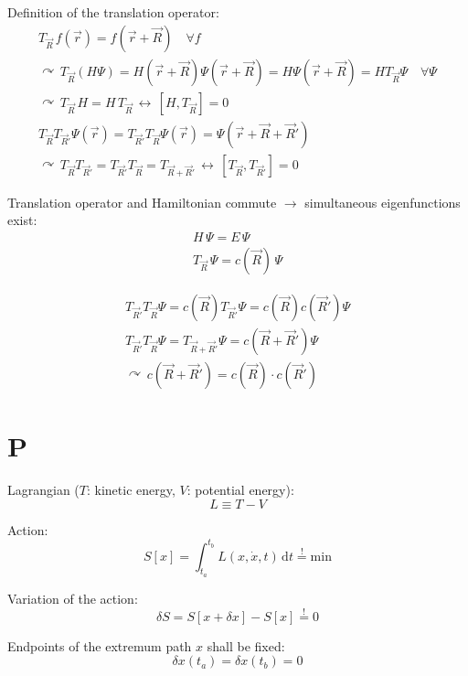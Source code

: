 \documentclass[fontsize=11pt,a4paper]{scrartcl}
\begin{document}
Definition of the translation operator:
\begin{gather*}
	T_{\vec R}\,f(\vec r)=f(\vec r+\vec R)\quad\forall f\\
	\curvearrowright\, T_{\vec R}(H\Psi)=H(\vec r+\vec R)\Psi(\vec r+\vec R)=H\Psi(\vec r+\vec R)=H T_{\vec R}\Psi\quad\forall\Psi\\
	\curvearrowright\,T_{\vec R}\, H=H\,T_{\vec R}\,\leftrightarrow\,[H,T_{\vec R}]=0\\
	T_{\vec R}T_{\vec R'}\Psi(\vec r)=T_{\vec R'}T_{\vec R}\Psi(\vec r)=\Psi(\vec r+\vec R+\vec R')\\
	\curvearrowright\,T_{\vec R}T_{\vec R'}=T_{\vec R'}T_{\vec R}=T_{\vec R+\vec R'}\,\leftrightarrow\,[T_{\vec R},T_{\vec R'}]=0
\end{gather*}

Translation operator and Hamiltonian commute $\to$ simultaneous eigenfunctions exist:
\begin{gather*}
	H\,\Psi=E\,\Psi\\
	T_{\vec R}\,\Psi=c(\vec R)\,\Psi
\end{gather*}

\begin{gather*}
	T_{\vec R'}T_{\vec R}\Psi=c(\vec R)T_{\vec R'}\Psi=c(\vec R)c(\vec R')\Psi\\
	T_{\vec R'}T_{\vec R}\Psi=T_{\vec R+\vec R'}\Psi=c(\vec R+\vec R')\Psi\\
	\curvearrowright\,c(\vec R+\vec R')=c(\vec R)\cdot c(\vec R')
\end{gather*}
%
%
%
%
%
\section{P}

Lagrangian ($T$: kinetic energy, $V$: potential energy):
\[
	L\equiv T-V
\]

Action:
\[
	S[x]=\int_{t_a}^{t_b} L(x,\dot x,t)\,\mathrm{d}t\stackrel{!}{=}\text{min}
\]

Variation of the action:
\[
	\delta S=S[x+\delta x]-S[x]\stackrel{!}{=}0
\]

Endpoints of the extremum path $x$ shall be fixed:
\[
	\delta x(t_a)=\delta x(t_b)=0
\]
\end{document}
